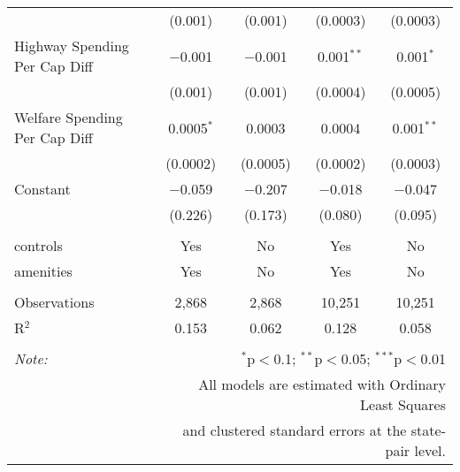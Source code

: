\begin{table}[!htbp]
\begin{tabular}{@{\extracolsep{5pt}}lcccc}
  & (0.001) & (0.001) & (0.0003) & (0.0003) \\ 
  Highway Spending Per Cap Diff & $-$0.001 & $-$0.001 & 0.001$^{**}$ & 0.001$^{*}$ \\ 
  & (0.001) & (0.001) & (0.0004) & (0.0005) \\ 
  Welfare Spending Per Cap Diff & 0.0005$^{*}$ & 0.0003 & 0.0004 & 0.001$^{**}$ \\ 
  & (0.0002) & (0.0005) & (0.0002) & (0.0003) \\ 
  Constant & $-$0.059 & $-$0.207 & $-$0.018 & $-$0.047 \\ 
  & (0.226) & (0.173) & (0.080) & (0.095) \\ 
 \hline \\[-1.8ex] 
controls & Yes & No & Yes & No \\ 
amenities & Yes & No & Yes & No \\ 
\hline \\[-1.8ex] 
Observations & 2,868 & 2,868 & 10,251 & 10,251 \\ 
R$^{2}$ & 0.153 & 0.062 & 0.128 & 0.058 \\ 
\hline 
\hline \\[-1.8ex] 
\textit{Note:}  & \multicolumn{4}{r}{$^{*}$p$<$0.1; $^{**}$p$<$0.05; $^{***}$p$<$0.01} \\ 
 & \multicolumn{4}{r}{All models are estimated with Ordinary Least Squares} \\ 
 & \multicolumn{4}{r}{and clustered standard errors at the state-pair level.} \\ 
\end{tabular} 
\end{table} 
